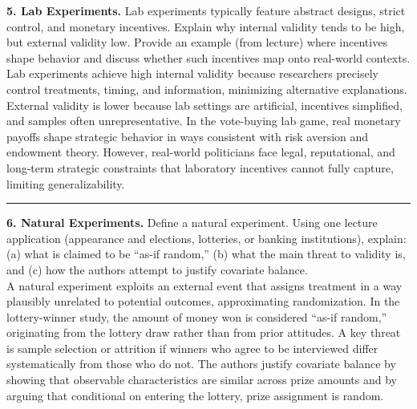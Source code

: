 \documentclass[12pt]{article}
\newcommand{\pts}[1]{\todo[color=blue!20,size=\tiny]{#1 pts}}
\begin{document}
\textbf{5. Lab Experiments.} Lab experiments typically feature abstract designs, strict control, and monetary incentives. Explain why internal validity tends to be high, but external validity low. Provide an example (from lecture) where incentives shape behavior and discuss whether such incentives map onto real-world contexts.\\[0.2cm]

\pts{2} Lab experiments achieve high internal validity because researchers precisely control treatments, timing, and information, minimizing alternative explanations. \pts{2} External validity is lower because lab settings are artificial, incentives simplified, and samples often unrepresentative. \pts{2} In the vote-buying lab game, real monetary payoffs shape strategic behavior in ways consistent with risk aversion and endowment theory. \pts{2} However, real-world politicians face legal, reputational, and long-term strategic constraints that laboratory incentives cannot fully capture, limiting generalizability.


\vspace{0.5cm}\hrule\vspace{0.4cm}

\textbf{6. Natural Experiments.} Define a natural experiment. Using one lecture application (appearance and elections, lotteries, or banking institutions), explain: (a) what is claimed to be ``as-if random,'' (b) what the main threat to validity is, and (c) how the authors attempt to justify covariate balance.\\[0.2cm]

\pts{2} A natural experiment exploits an external event that assigns treatment in a way plausibly unrelated to potential outcomes, approximating randomization. \pts{2} In the lottery-winner study, the amount of money won is considered ``as-if random,'' originating from the lottery draw rather than from prior attitudes. \pts{2} A key threat is sample selection or attrition if winners who agree to be interviewed differ systematically from those who do not. \pts{2} The authors justify covariate balance by showing that observable characteristics are similar across prize amounts and by arguing that conditional on entering the lottery, prize assignment is random.
\end{document}
